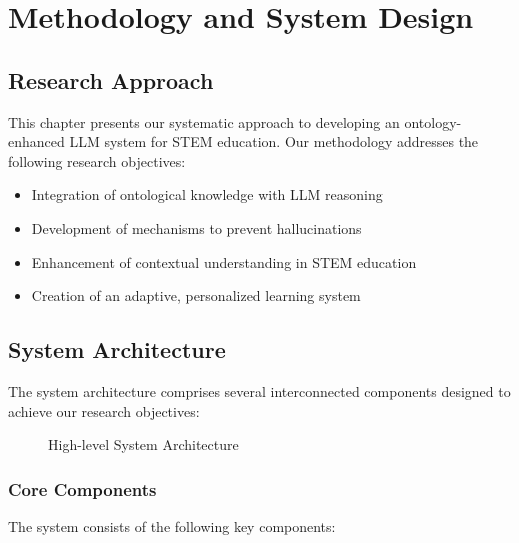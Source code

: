 \chapter{Methodology and System Design}
\label{chap:methodology}

\section{Research Approach}
This chapter presents our systematic approach to developing an ontology-enhanced LLM system for STEM education. Our methodology addresses the following research objectives:

\begin{itemize}
    \item Integration of ontological knowledge with LLM reasoning
    \item Development of mechanisms to prevent hallucinations
    \item Enhancement of contextual understanding in STEM education
    \item Creation of an adaptive, personalized learning system
\end{itemize}

\section{System Architecture}
\label{sec:system-architecture}

The system architecture comprises several interconnected components designed to achieve our research objectives:

\begin{figure}[h]
    \centering
    \caption{High-level System Architecture}
    \label{fig:system-architecture}
\end{figure}

\subsection{Core Components}
\label{subsec:core-components}

The system consists of the following key components:

